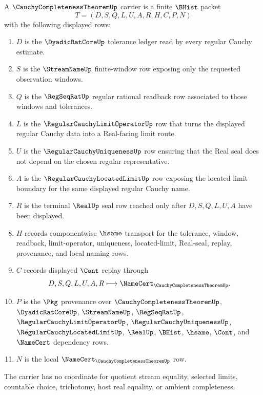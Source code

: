\begin{definition}
\label{def:cauchy-completeness-theorem-carrier}
A $\CauchyCompletenessTheoremUp$ carrier is a finite $\BHist$ packet
$$
T=(D,S,Q,L,U,A,R,H,C,P,N)
$$
with the following displayed rows:
\begin{enumerate}
\item $D$ is the $\DyadicRatCoreUp$ tolerance ledger read by every regular Cauchy estimate.
\item $S$ is the $\StreamNameUp$ finite-window row exposing only the requested observation windows.
\item $Q$ is the $\RegSeqRatUp$ regular rational readback row associated to those windows and tolerances.
\item $L$ is the $\RegularCauchyLimitOperatorUp$ row that turns the displayed regular Cauchy data into a Real-facing limit route.
\item $U$ is the $\RegularCauchyUniquenessUp$ row ensuring that the Real seal does not depend on the chosen regular representative.
\item $A$ is the $\RegularCauchyLocatedLimitUp$ row exposing the located-limit boundary for the same displayed regular Cauchy name.
\item $R$ is the terminal $\RealUp$ seal row reached only after $D,S,Q,L,U,A$ have been displayed.
\item $H$ records componentwise $\hsame$ transport for the tolerance, window, readback, limit-operator, uniqueness, located-limit, Real-seal, replay, provenance, and local naming rows.
\item $C$ records displayed $\Cont$ replay through
$$
D,S,Q,L,U,A,R \longmapsto \NameCert_{\CauchyCompletenessTheoremUp}.
$$
\item $P$ is the $\Pkg$ provenance over $\CauchyCompletenessTheoremUp$, $\DyadicRatCoreUp$, $\StreamNameUp$, $\RegSeqRatUp$, $\RegularCauchyLimitOperatorUp$, $\RegularCauchyUniquenessUp$, $\RegularCauchyLocatedLimitUp$, $\RealUp$, $\BHist$, $\hsame$, $\Cont$, and $\NameCert$ dependency rows.
\item $N$ is the local $\NameCert_{\CauchyCompletenessTheoremUp}$ row.
\end{enumerate}
The carrier has no coordinate for quotient stream equality, selected limits, countable choice, trichotomy, host real equality, or ambient completeness.
\end{definition}


